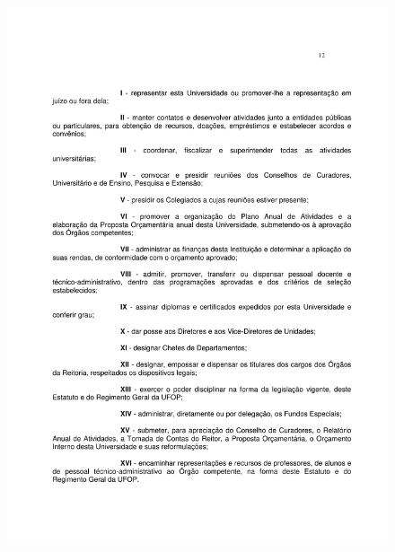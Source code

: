 \begin{figure}[p]
	\centering 
	\includegraphics[scale=0.7]{capitulos/resolucoes/cuni414/cuni414-12.pdf}
\end{figure} \pagebreak


